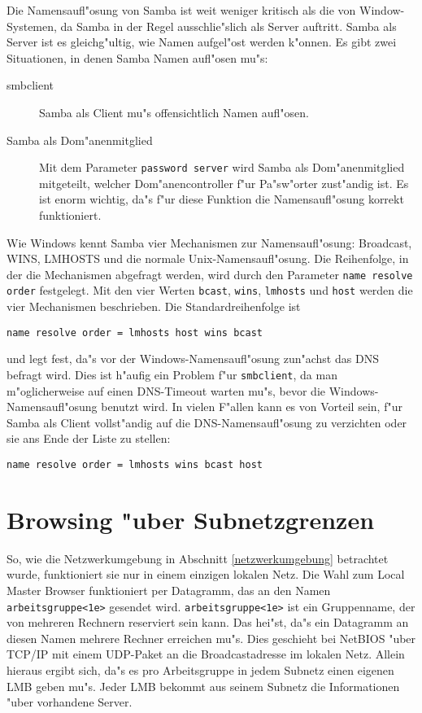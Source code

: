 \documentclass{scrartcl}\usepackage{pslatex}\typearea{12}
\newcommand{\prog}{\texttt}
\newcommand{\param}{\texttt}
\newcommand{\nbname}{\texttt}
\newcommand{\todo}[1]{}
\begin{document}
\todo{Tabelle}

Die Namensaufl"osung von Samba ist weit weniger kritisch als die von
Window-Systemen, da Samba in der Regel ausschlie"slich als Server
auftritt. Samba als Server ist es gleichg"ultig, wie Namen aufgel"ost
werden k"onnen. Es gibt zwei Situationen, in denen Samba Namen
aufl"osen mu"s:

\begin{description}
\item[smbclient] Samba als Client mu"s offensichtlich Namen aufl"osen.
\item[Samba als Dom"anenmitglied] Mit dem Parameter \param{password
    server} wird Samba als Dom"anenmitglied mitgeteilt, welcher
  Dom"anencontroller f"ur Pa"sw"orter zust"andig ist. Es ist enorm
  wichtig, da"s f"ur diese Funktion die Namensaufl"osung korrekt
  funktioniert.
\end{description}

Wie Windows kennt Samba vier Mechanismen zur Namensaufl"osung:
Broadcast, WINS, LMHOSTS und die normale Unix-Namensaufl"osung. Die
Reihenfolge, in der die Mechanismen abgefragt werden, wird durch den
Parameter \param{name resolve order} festgelegt. Mit den vier Werten
\param{bcast}, \param{wins}, \param{lmhosts} und \param{host} werden
die vier Mechanismen beschrieben. Die Standardreihenfolge ist

\begin{verbatim}
name resolve order = lmhosts host wins bcast
\end{verbatim}

\noindent und legt fest, da"s vor der Windows-Namensaufl"osung zun"achst das
DNS
befragt wird. Dies ist h"aufig ein Problem f"ur \prog{smbclient}, da
man m"oglicherweise auf einen DNS-Timeout warten mu"s, bevor die
Windows-Namensaufl"osung benutzt wird. In vielen F"allen kann es von
Vorteil sein, f"ur Samba als Client vollst"andig auf die
DNS-Namensaufl"osung zu verzichten oder sie ans Ende der Liste zu
stellen:

\begin{verbatim}
name resolve order = lmhosts wins bcast host
\end{verbatim}

\section{Browsing "uber Subnetzgrenzen}
\label{browsing-im-wan}

So, wie die Netzwerkumgebung in Abschnitt \ref{netzwerkumgebung}
betrachtet wurde, funktioniert sie nur in einem einzigen lokalen Netz.
Die Wahl zum Local Master Browser funktioniert per Datagramm, das an
den Namen \nbname{arbeitsgruppe<1e>} gesendet wird.
\nbname{arbeitsgruppe<1e>} ist ein Gruppenname, der von mehreren
Rechnern reserviert sein kann. Das hei"st, da"s ein Datagramm an
diesen Namen mehrere Rechner erreichen mu"s. Dies geschieht bei
NetBIOS "uber TCP/IP mit einem UDP-Paket an die Broadcastadresse im
lokalen Netz. Allein hieraus ergibt sich, da"s es pro Arbeitsgruppe in
jedem Subnetz einen eigenen LMB geben mu"s. Jeder LMB bekommt aus
seinem Subnetz die Informationen "uber vorhandene Server.
\end{document}
